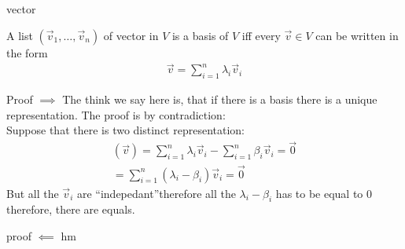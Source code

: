 \begin{parag}{vector}
    \begin{theoreme}
    A list $\left(\vec{v}_1, \ldots, \vec{v}_n\right)$ of vector in $V$ is a basis of $V$ iff every $\vec{v} \in V$ can be written  in the form
    \begin{align*} 
        \vec{v} = \sum_{i = 1}^{n} \lambda_i \vec{v}_i
    \end{align*}
    \end{theoreme}
    \begin{subparag}{Proof $\implies$}
        The think we say here is, that if there is a basis  there is a unique representation. The proof is by contradiction:\\
        Suppose that there is two distinct representation:
        \begin{align*} 
            \left(\vec{v}\right) = \sum_{i = 1}^{n} \lambda_i \vec{v}_i - \sum_{i =  1}^{n} \beta_i \vec{v}_i = \vec{0}\\
            = \sum_{i =  1}^{n} \left(\lambda_i - \beta_i\right) \vec{v}_i =  \vec{0}
        \end{align*}
        But all the $\vec{v}_i$ are ``indepedant''therefore all the $\lambda_i - \beta_i$ has to be equal to $0$ therefore, there are equals.
    \end{subparag}
    \begin{subparag}{proof $\impliedby$}
        hm
    \end{subparag}
\end{parag}

